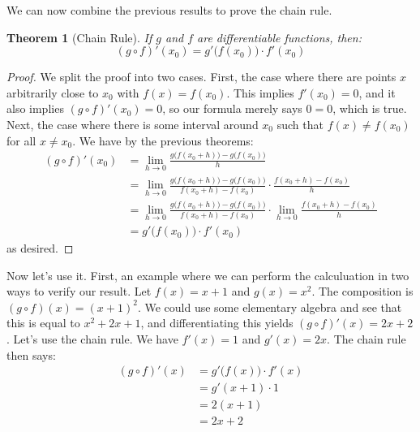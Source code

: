 \documentclass{article}
\theoremstyle{plain}
\newtheorem{theorem}{Theorem}
\begin{document}
    We can now combine the previous results to prove the chain rule.
    \begin{theorem}[Chain Rule]
        If $g$ and $f$ are differentiable functions, then:
        \begin{equation}
            (g\circ{f})'(x_{0})=g'\big(f(x_{0})\big)\cdot{f}'(x_{0})
        \end{equation}
    \end{theorem}
    \begin{proof}
        We split the proof into two cases. First, the case where there are
        points $x$ arbitrarily close to $x_{0}$ with $f(x)=f(x_{0})$. This
        implies $f'(x_{0})=0$, and it also implies
        $(g\circ{f})'(x_{0})=0$, so our formula merely says $0=0$,
        which is true. Next, the case where there is some interval around
        $x_{0}$ such that $f(x)\ne{f}(x_{0})$ for all $x\ne{x}_{0}$. We have
        by the previous theorems:
        \begin{align}
            (g\circ{f})'(x_{0})
            &=\lim_{h\rightarrow{0}}
            \frac{g\big(f(x_{0}+h)\big)-g\big(f(x_{0})\big)}{h}\\
            &=\lim_{h\rightarrow{0}}
            \frac{g\big(f(x_{0}+h)\big)-g\big(f(x_{0})\big)}{f(x_{0}+h)-f(x_{0})}
            \cdot\frac{f(x_{0}+h)-f(x_{0})}{h}\\
            &=
            \lim_{h\rightarrow{0}}
            \frac{g\big(f(x_{0}+h)\big)-g\big(f(x_{0})\big)}{f(x_{0}+h)-f(x_{0})}
            \cdot\lim_{h\rightarrow{0}}\frac{f(x_{0}+h)-f(x_{0})}{h}\\
            &=g'\big(f(x_{0})\big)\cdot{f}'(x_{0})
        \end{align}
        as desired.
    \end{proof}
    Now let's use it. First, an example where we can perform the calculuation
    in two ways to verify our result. Let $f(x)=x+1$ and $g(x)=x^2$. The
    composition is $(g\circ{f})(x)=(x+1)^{2}$. We could use some elementary
    algebra and see that this is equal to $x^{2}+2x+1$, and differentiating this
    yields $(g\circ{f})'(x)=2x+2$. Let's use the chain rule. We have
    $f'(x)=1$ and $g'(x)=2x$. The chain rule then says:
    \begin{align}
        (g\circ{f})'(x)
            &=g'\big(f(x)\big)\cdot{f}'(x)
                \tag{Chain Rule}\\
            &=g'(x+1)\cdot{1}
                \tag{Substitute $f$ and $f'$}\\
            &=2(x+1)
                \tag{Substitute $g'$}\\
            &=2x+2
                \tag{Simplify}
    \end{align}
\end{document}
